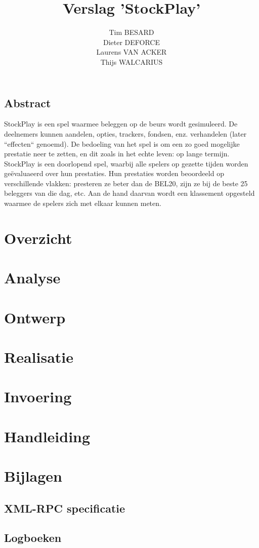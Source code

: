 \documentclass[a4paper,oneside,final]{memoir}
\title{Verslag 'StockPlay'}
\author{
Tim BESARD\\
Dieter DEFORCE\\
Laurens VAN ACKER\\
Thijs WALCARIUS
}
\begin{document}
\maketitle
{}
\tableofcontents
{}


%
%

\chapter*{Abstract}
StockPlay is een spel waarmee beleggen op de beurs wordt gesimuleerd. De deelnemers kunnen aandelen, opties, trackers, fondsen, enz. verhandelen (later ``effecten`` genoemd). De bedoeling van het spel is om een zo goed mogelijke prestatie neer te zetten, en dit zoals in het echte leven: op lange termijn. StockPlay is een doorlopend spel, waarbij alle spelers op gezette tijden worden ge\"evaluaeerd over hun prestaties. Hun prestaties worden beoordeeld op verschillende vlakken: presteren ze beter dan de BEL20, zijn ze bij de beste 25 beleggers van die dag, etc. Aan de hand daarvan wordt een klassement opgesteld waarmee de spelers zich met elkaar kunnen meten.

\part{Overzicht}
\label{pt:overzicht}


\part{Analyse}
\label{pt:analyse}


\part{Ontwerp}
\label{pt:ontwerp}


\part{Realisatie}
\label{pt:realisatie}


\part{Invoering}
\label{pt:invoering}


\part{Handleiding}
\label{pt:handleiding}


%
%

\part{Bijlagen}
\label{pt:bijlagen}
\appendix

\chapter{XML-RPC specificatie}


\chapter{Logboeken}

\end{document}
